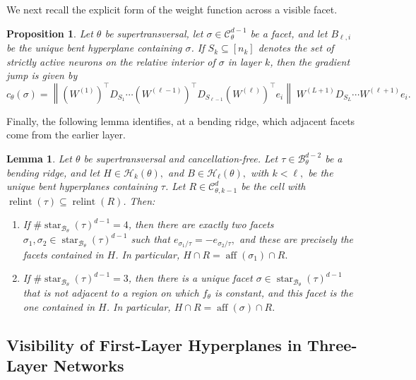 \documentclass{article}
\newtheorem{prop}[theorem]{Proposition}
\newtheorem{lemma}[theorem]{Lemma}
\theoremstyle{definition}
\newcommand{\aff}{\operatorname{aff}}
\newcommand{\weights}[1]{W^{(#1)}}
\newcommand{\complex}{\mathcal{C}}
\newcommand{\hyperplanes}[2]{\mathcal{H}_{#1}(#2)}
\newcommand{\bcomplex}[1]{\mathcal{B}_{#1}}
\newcommand{\str}{\operatorname{star}}
\newcommand{\relint}{\operatorname{relint}}
\begin{document}
We next recall the explicit form of the weight function across a visible facet.

\begin{prop}
\label{prop:tropweightofNNs}
Let $\theta$ be supertransversal, let $\sigma \in \complex_\theta^{d-1}$ be a facet, and let
$B_{\ell,i}$ be the unique bent hyperplane containing $\sigma$. If $S_k \subseteq [n_k]$ denotes the
set of strictly active neurons on the relative interior of $\sigma$ in layer $k$, then the gradient jump is given by
\[
c_\theta(\sigma)
=
\left\|
(\weights{1})^\top D_{S_1}\cdots (\weights{\ell-1})^\top D_{S_{\ell-1}}(\weights{\ell})^\top e_i
\right\|
\;
\weights{L+1}D_{S_L}\cdots \weights{\ell+1}e_i.
\]
\end{prop}

Finally, the following lemma identifies, at a bending ridge, which adjacent facets come from the earlier
layer.

\begin{lemma}
\label{lem:bendingoptions}
Let $\theta$ be supertransversal and cancellation-free.
Let $\tau \in \bcomplex{\theta}^{d-2}$ be a bending ridge, and let
$
H \in \hyperplanes{k}{\theta},
$ and $
B \in \hyperplanes{\ell}{\theta},
$ with $
k<\ell,
$
be the unique bent hyperplanes containing $\tau$.
Let $R \in \complex_{\theta,k-1}^d$ be the cell with $\relint(\tau)\subseteq \relint(R)$.
Then:
\begin{enumerate}[leftmargin=*]
    \item If $\#\str_{\bcomplex{\theta}}(\tau)^{d-1}=4$, then there are exactly two facets
    $\sigma_1,\sigma_2 \in \str_{\bcomplex{\theta}}(\tau)^{d-1}$ such that
    $
    e_{\sigma_1/\tau}=-e_{\sigma_2/\tau},
    $
    and these are precisely the facets contained in $H$. In particular,
    $
    H\cap R = \aff(\sigma_1)\cap R.
    $

    \item If $\#\str_{\bcomplex{\theta}}(\tau)^{d-1}=3$, then there is a unique facet
    $\sigma \in \str_{\bcomplex{\theta}}(\tau)^{d-1}$ that is not adjacent to a region on which
    $f_\theta$ is constant, and this facet is the one contained in $H$. In particular,
    $
    H\cap R = \aff(\sigma)\cap R.
    $
\end{enumerate}
\end{lemma}


\subsection{Visibility of First-Layer Hyperplanes in Three-Layer Networks}
\label{sec:last_layer}
\end{document}
